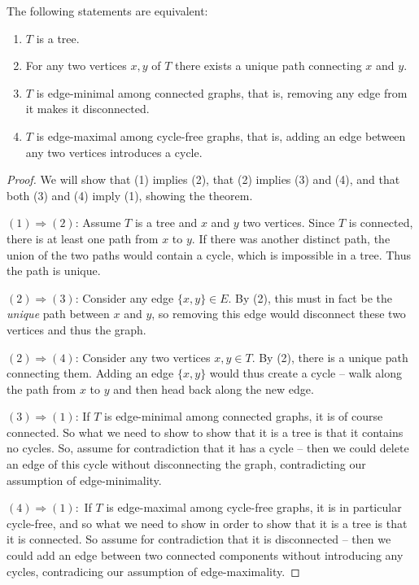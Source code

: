 \documentclass[nobib]{tufte-handout}
\begin{document}
\begin{theorem}\label{theorem:classification_of_trees}
  The following statements are equivalent:
  \begin{enumerate}
    \item $T$ is a tree.
    \item For any two vertices $x, y$ of $T$ there exists a unique path connecting $x$ and $y$.
    \item $T$ is edge-minimal among connected graphs, that is, removing any edge from it makes it disconnected.
    \item $T$ is edge-maximal among cycle-free graphs, that is, adding an edge between any two vertices introduces a cycle.
  \end{enumerate}

  \begin{proof}
    We will show that (1) implies (2), that (2) implies (3) and (4), and that both (3) and (4) imply (1), showing the theorem.

    $(1) \Rightarrow (2)$: Assume $T$ is a tree and $x$ and $y$ two vertices. Since $T$ is connected, there is at least one path from $x$ to $y$. If there was another distinct path, the union of the two paths would contain a cycle, which is impossible in a tree. Thus the path is unique.

    $(2) \Rightarrow (3)$: Consider any edge $\{x,y\} \in E$. By (2), this must in fact be the \emph{unique} path between $x$ and $y$, so removing this edge would disconnect these two vertices and thus the graph.

    $(2) \Rightarrow (4)$: Consider any two vertices $x, y \in T$. By (2), there is a unique path connecting them. Adding an edge $\{x,y\}$ would thus create a cycle -- walk along the path from $x$ to $y$ and then head back along the new edge.

    $(3) \Rightarrow (1)$: If $T$ is edge-minimal among connected graphs, it is of course connected. So what we need to show to show that it is a tree is that it contains no cycles. So, assume for contradiction that it has a cycle -- then we could delete an edge of this cycle without disconnecting the graph, contradicting our assumption of edge-minimality.

    $(4) \Rightarrow (1):$ If $T$ is edge-maximal among cycle-free graphs, it is in particular cycle-free, and so what we need to show in order to show that it is a tree is that it is connected. So assume for contradiction that it is disconnected -- then we could add an edge between two connected components without introducing any cycles, contradicing our assumption of edge-maximality.
  \end{proof}
\end{theorem}
\end{document}
